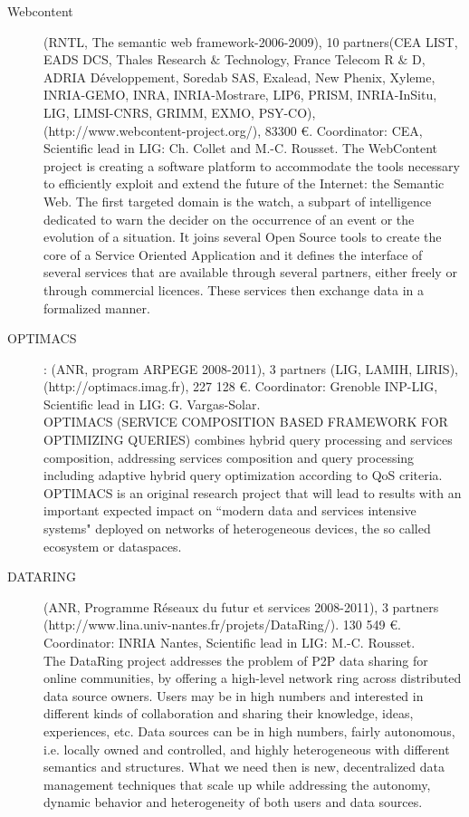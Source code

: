 \begin{description}

\item[Webcontent] (RNTL, The semantic web framework-2006-2009), 10 partners(CEA LIST, EADS DCS, Thales Research  $\&$ Technology, France Telecom R  $\&$ D, ADRIA D{\'e}veloppement, Soredab SAS, Exalead, New Phenix, Xyleme, INRIA-GEMO, INRA, INRIA-Mostrare, LIP6, PRISM, INRIA-InSitu, LIG, LIMSI-CNRS, GRIMM, EXMO, PSY-CO), \\
(http://www.webcontent-project.org/), 83300 \euro. Coordinator: CEA, Scientific lead in LIG: Ch. Collet and M.-C. Rousset. 
The WebContent project is creating a software platform to accommodate the tools necessary to efficiently exploit and extend the future of the Internet: the Semantic Web. The first targeted domain is the watch, a subpart of intelligence dedicated to warn the decider on the occurrence of an event or the evolution of a situation. It joins several Open Source tools to create the core of a Service Oriented Application and it defines the interface of several services that are available through several partners, either freely or through commercial licences. These services then exchange data in a formalized manner.


\item[OPTIMACS]: (ANR, program ARPEGE 2008-2011), 3 partners (LIG, LAMIH, LIRIS),  (http://optimacs.imag.fr), 227 128 \euro. Coordinator: Grenoble INP-LIG, Scientific lead in LIG: G. Vargas-Solar. \\
OPTIMACS (SERVICE COMPOSITION BASED FRAMEWORK FOR OPTIMIZING QUERIES) combines hybrid query processing and services composition, addressing services composition and query processing including adaptive hybrid query optimization according to QoS criteria. OPTIMACS is an original research project that will lead to results with an important expected impact on ``modern data and services intensive systems" deployed on networks of heterogeneous devices, the so called ecosystem or dataspaces.

\item[DATARING] (ANR, Programme R{\'e}seaux du futur et services 2008-2011), 3 partners (http://www.lina.univ-nantes.fr/projets/DataRing/). 130 549 \euro. Coordinator: INRIA Nantes, Scientific lead in LIG: M.-C. Rousset. \\
The DataRing project addresses the problem of P2P data sharing for online communities, by offering a high-level network ring across distributed data source owners. Users may be in high numbers and interested in different kinds of collaboration and sharing their knowledge, ideas, experiences, etc. Data sources can be in high numbers, fairly autonomous, i.e. locally owned and controlled, and highly heterogeneous with different semantics and structures. What we need then is new, decentralized data management techniques that scale up while addressing the autonomy, dynamic behavior and heterogeneity of both users and data sources.


\end{description}

